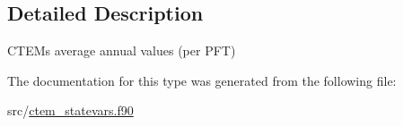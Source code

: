\subsection{Detailed Description}
C\+T\+E\+M\textquotesingle{}s average annual values (per P\+F\+T) 

The documentation for this type was generated from the following file\+:\begin{DoxyCompactItemize}
\item 
src/\hyperlink{ctem__statevars_8f90}{ctem\+\_\+statevars.\+f90}\end{DoxyCompactItemize}
